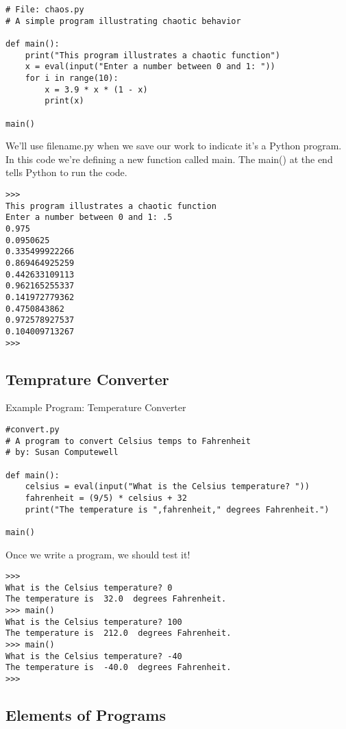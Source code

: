 \documentclass[12pt,a4paper,final,twoside,onecolumn,titlepage]{book}
\begin{document}
\lstset{language=Python, tabsize=4}
\begin{lstlisting}
# File: chaos.py
# A simple program illustrating chaotic behavior

def main():
    print("This program illustrates a chaotic function")
    x = eval(input("Enter a number between 0 and 1: "))
    for i in range(10):
        x = 3.9 * x * (1 - x)
        print(x)

main()
\end{lstlisting}
We’ll use filename.py when we save our work to indicate it’s a Python program. In this code we’re defining a new function called main. The main() at the end tells Python to run the code.
\lstset{language=Python, tabsize=4}
\begin{lstlisting}
>>> 
This program illustrates a chaotic function
Enter a number between 0 and 1: .5
0.975
0.0950625
0.335499922266
0.869464925259
0.442633109113
0.962165255337
0.141972779362
0.4750843862
0.972578927537
0.104009713267
>>> 
\end{lstlisting}
\subsection{Temprature Converter}
Example Program: Temperature Converter
\lstset{language=Python, tabsize=4}
\begin{lstlisting}
#convert.py
# A program to convert Celsius temps to Fahrenheit
# by: Susan Computewell

def main():
    celsius = eval(input("What is the Celsius temperature? "))
    fahrenheit = (9/5) * celsius + 32
    print("The temperature is ",fahrenheit," degrees Fahrenheit.")

main()
\end{lstlisting}
Once we write a program, we should test it!
\lstset{language=Python, tabsize=4}
\begin{lstlisting}
>>> 
What is the Celsius temperature? 0
The temperature is  32.0  degrees Fahrenheit.
>>> main()
What is the Celsius temperature? 100
The temperature is  212.0  degrees Fahrenheit.
>>> main()
What is the Celsius temperature? -40
The temperature is  -40.0  degrees Fahrenheit.
>>> 
\end{lstlisting}
\subsection{Elements of Programs}
\end{document}
